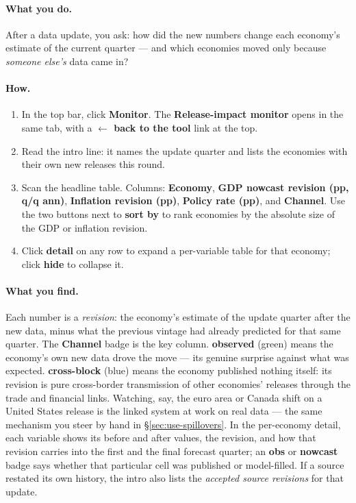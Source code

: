 \documentclass[11pt]{article}
\theoremstyle{definition}
\theoremstyle{remark}
\begin{document}
\paragraph{What you do.}
After a data update, you ask: how did the new numbers change each economy's
estimate of the current quarter --- and which economies moved only because
\emph{someone else's} data came in?

\paragraph{How.}
\begin{enumerate}
  \item In the top bar, click \textbf{Monitor}. The \textbf{Release-impact
    monitor} opens in the same tab, with a \textbf{$\leftarrow$ back to the tool}
    link at the top.
  \item Read the intro line: it names the update quarter and lists the economies
    with their own new releases this round.
  \item Scan the headline table. Columns: \textbf{Economy}, \textbf{GDP nowcast
    revision (pp, q/q ann)}, \textbf{Inflation revision (pp)}, \textbf{Policy rate
    (pp)}, and \textbf{Channel}. Use the two buttons next to \textbf{sort by} to
    rank economies by the absolute size of the GDP or inflation revision.
  \item Click \textbf{detail} on any row to expand a per-variable table for that
    economy; click \textbf{hide} to collapse it.
\end{enumerate}

\paragraph{What you find.}
Each number is a \emph{revision}: the economy's estimate of the update quarter
after the new data, minus what the previous vintage had already predicted for that
same quarter. The \textbf{Channel} badge is the key column. \textbf{observed}
(green) means the economy's own new data drove the move --- its genuine surprise
against what was expected. \textbf{cross-block} (blue) means the economy published
nothing itself: its revision is pure cross-border transmission of other economies'
releases through the trade and financial links. Watching, say, the euro area or
Canada shift on a United States release is the linked system at work on real data
--- the same mechanism you steer by hand in \S\ref{sec:use-spillovers}. In the
per-economy detail, each variable shows its before and after values, the revision,
and how that revision carries into the first and the final forecast quarter; an
\textbf{obs} or \textbf{nowcast} badge says whether that particular cell was
published or model-filled. If a source restated its own history, the intro also
lists the \emph{accepted source revisions} for that update.
\end{document}
